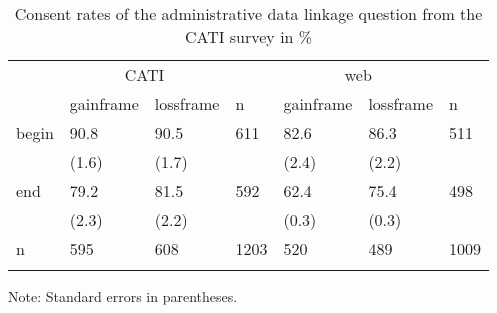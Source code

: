 \begin{table}[h]
\caption{Consent rates of the administrative data linkage question from the CATI survey in \%}\label{tab:consentrates}
\begin{tabularx}{\textwidth}{XXXXXXl}
&\multicolumn{2}{c}{CATI}& \ \ \ \ &	\multicolumn{2}{c}{web} &\\
\cline{2-4} \cline{5-7} \addlinespace 
& gainframe	& lossframe	& n & gainframe	& lossframe	& n \\ \addlinespace
\midrule
begin	& 90.8 	& 90.5 	& 611 & 82.6 &	86.3	& 511 \\ 
	& (1.6) 	& (1.7) 	&  & (2.4) &	(2.2)	& \\ \addlinespace
end	&79.2 	&81.5 	&592 & 62.4	&75.4	& 498 \\
	&(2.3) 	&(2.2)	& & (0.3)	&(0.3)	&  \\ \addlinespace
n	&595	&608	&1203 & 520	&489	& 1009 \\ \addlinespace
\bottomrule
\end{tabularx}
\begin{tablenotes}
	\begin{footnotesize}
		\item{Note: Standard errors in parentheses.} 
	\end{footnotesize}
	\end{tablenotes}
\end{table}
